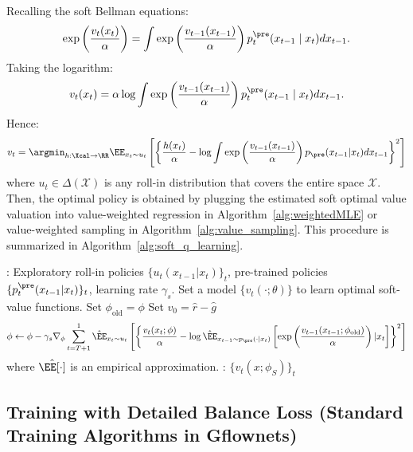 Recalling the soft Bellman equations:
\begin{align*} 
\exp \left  (\frac{ v_{t}(x_{t})}{\alpha} \right )=  \int \exp\left (\frac{ v_{t-1}(x_{t-1})}{\alpha}\right)p^{\pre}_{t}(x_{t-1} \mid x_{t}) d x_{t-1}. 
\end{align*}
Taking the logarithm:
\begin{align*} 
 v_{t}(x_{t}) = \alpha \log \int \exp\left (\frac{ v_{t-1}(x_{t-1})}{\alpha}\right)p^{\pre}_{t}(x_{t-1} \mid x_{t}) d x_{t-1}. 
\end{align*}
Hence: 
\begin{align*}
     v_t = \argmin_{h:\Xcal \to \RR}\EE_{x_t\sim u_t} \left[\left \{\frac{h(x_t)}{\alpha} -\log \int \exp\left( \frac{v_{t-1}(x_{t-1})}{\alpha} \right)p_{\pre}(x_{t-1}|x_t) d x_{t-1}  \right \}^2   \right ]
\end{align*}
where $u_t \in \Delta(\mathcal{X})$ is any roll-in distribution that covers the entire space $\mathcal{X}$. Then, the optimal policy is obtained by plugging the estimated soft optimal value valuation into value-weighted regression in Algorithm~\ref{alg:weightedMLE} or value-weighted sampling in Algorithm~\ref{alg:value_sampling}. This procedure is summarized in Algorithm~\ref{alg:soft_q_learning}.

\begin{algorithm}[!t]
\caption{Soft-Q-learning}\label{alg:soft_q_learning}
\begin{algorithmic}[1]
 : Exploratory roll-in policies $\{u_{t}(x_{t-1}|x_t)\}_t$, pre-trained policies $\{p^{\pre}_{t}(x_{t-1}|x_t)\}_t$, learning rate $\gamma_s$. 
 \STATE Set a model $\{v_t(\cdot;\theta)\}$ to learn optimal soft-value functions.  
      \STATE Set $\phi_{\mathrm{old}} = \phi $
      \STATE Set $v_0 = \hat r-\hat g$
      {\small 
     \begin{align*}
    \phi  \leftarrow \phi-\gamma_s \nabla_{\phi} \sum_{t=T+1}^1  \hat \EE_{x_t \sim u_t}\left[\left \{\frac{v_t(x_t;\phi)}{\alpha} -\log \hat \EE_{x_{t-1} \sim p_{\pre}(\cdot|x_t)}\left[ \exp\left( \frac{v_{t-1}(x_{t-1};\phi_{\mathrm{old}})}{\alpha} \right)|x_t\right]  \right \}^2   
    \right ] 
     \end{align*}
     } 
     where $\hat \EE[\cdot]$ is an empirical approximation. 
   \ENDFOR 
  : $\{v_t(x;\phi_S)\}_t$
\end{algorithmic}
\end{algorithm}

\subsection{Training with Detailed Balance Loss (Standard Training Algorithms in Gflownets)}


